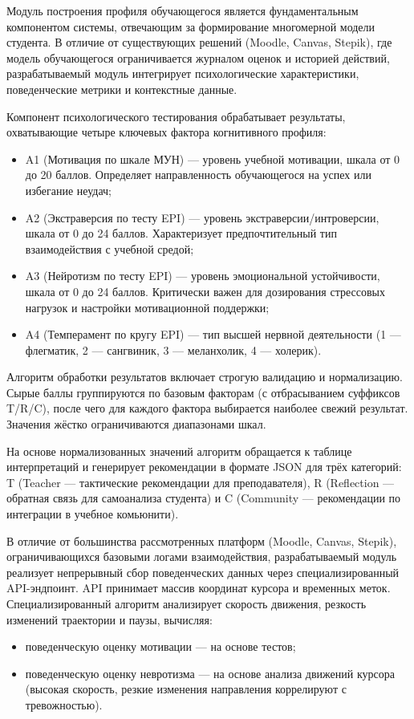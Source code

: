 Модуль построения профиля обучающегося является фундаментальным компонентом системы, 
отвечающим за формирование многомерной модели студента. В отличие от существующих 
решений (Moodle, Canvas, Stepik), где модель обучающегося ограничивается журналом 
оценок и историей действий, разрабатываемый модуль интегрирует психологические 
характеристики, поведенческие метрики и контекстные данные.

Компонент психологического тестирования обрабатывает результаты, охватывающие 
четыре ключевых фактора когнитивного профиля:
\begin{itemize}
    \item A1 (Мотивация по шкале МУН) --- уровень учебной мотивации, шкала от 0 до 20 баллов. Определяет направленность обучающегося на успех или избегание неудач;
    \item A2 (Экстраверсия по тесту EPI) --- уровень экстраверсии/интроверсии, шкала от 0 до 24 баллов. Характеризует предпочтительный тип взаимодействия с учебной средой;
    \item A3 (Нейротизм по тесту EPI) --- уровень эмоциональной устойчивости, шкала от 0 до 24 баллов. Критически важен для дозирования стрессовых нагрузок и настройки мотивационной поддержки;
    \item A4 (Темперамент по кругу EPI) --- тип высшей нервной деятельности (1 --- флегматик, 2 --- сангвиник, 3 --- меланхолик, 4 --- холерик).
\end{itemize}

Алгоритм обработки результатов включает строгую валидацию и нормализацию. 
Сырые баллы группируются по базовым факторам (с отбрасыванием суффиксов T/R/C), 
после чего для каждого фактора выбирается наиболее свежий результат. Значения 
жёстко ограничиваются диапазонами шкал.

На основе нормализованных значений алгоритм обращается к таблице интерпретаций 
и генерирует рекомендации в формате JSON для трёх категорий: T (Teacher --- 
тактические рекомендации для преподавателя), R (Reflection --- обратная связь 
для самоанализа студента) и C (Community --- рекомендации по интеграции в учебное комьюнити).

В отличие от большинства рассмотренных платформ (Moodle, Canvas, Stepik), 
ограничивающихся базовыми логами взаимодействия, разрабатываемый модуль 
реализует непрерывный сбор поведенческих данных через специализированный 
API-эндпоинт. API принимает массив координат курсора и временных меток. 
Специализированный алгоритм анализирует скорость движения, резкость изменений 
траектории и паузы, вычисляя:
\begin{itemize}
    \item поведенческую оценку мотивации --- на основе тестов;
    \item поведенческую оценку невротизма --- на основе анализа движений курсора (высокая скорость, резкие изменения направления коррелируют с тревожностью).
\end{itemize}


